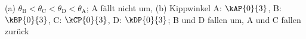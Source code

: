 (a) $\theta_\mathrm{B} < \theta_\mathrm{C} < \theta_\mathrm{D} < \theta_\mathrm{A}$; A fällt nicht um, (b) Kippwinkel A: $\kAP{0}{3}$, B: $\kBP{0}{3}$, C: $\kCP{0}{3}$, D: $\kDP{0}{3}$; B und D fallen um, A und C fallen zurück
